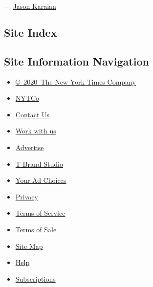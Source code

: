 --- \href{https://www.nytimes.com/by/jason-karaian}{Jason Karaian}

\hypertarget{site-index}{%
\subsection{Site Index}\label{site-index}}

\hypertarget{site-information-navigation}{%
\subsection{Site Information
Navigation}\label{site-information-navigation}}

\begin{itemize}
\tightlist
\item
  \href{https://help.nytimes.com/hc/en-us/articles/115014792127-Copyright-notice}{©~2020~The
  New York Times Company}
\end{itemize}

\begin{itemize}
\tightlist
\item
  \href{https://www.nytco.com/}{NYTCo}
\item
  \href{https://help.nytimes.com/hc/en-us/articles/115015385887-Contact-Us}{Contact
  Us}
\item
  \href{https://www.nytco.com/careers/}{Work with us}
\item
  \href{https://nytmediakit.com/}{Advertise}
\item
  \href{http://www.tbrandstudio.com/}{T Brand Studio}
\item
  \href{https://www.nytimes.com/privacy/cookie-policy\#how-do-i-manage-trackers}{Your
  Ad Choices}
\item
  \href{https://www.nytimes.com/privacy}{Privacy}
\item
  \href{https://help.nytimes.com/hc/en-us/articles/115014893428-Terms-of-service}{Terms
  of Service}
\item
  \href{https://help.nytimes.com/hc/en-us/articles/115014893968-Terms-of-sale}{Terms
  of Sale}
\item
  \href{https://spiderbites.nytimes.com}{Site Map}
\item
  \href{https://help.nytimes.com/hc/en-us}{Help}
\item
  \href{https://www.nytimes.com/subscription?campaignId=37WXW}{Subscriptions}
\end{itemize}
